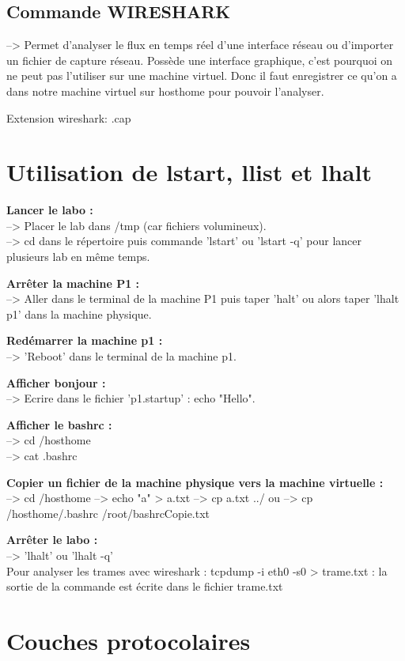 \documentclass[a4paper]{article}
\begin{document}
		\subsection{Commande WIRESHARK}
--> Permet d'analyser le flux en temps réel d'une interface réseau ou d'importer un fichier de capture réseau.
Possède une interface graphique, c’est pourquoi on ne peut pas l’utiliser sur une machine virtuel. Donc il faut enregistrer ce qu’on a dans notre machine virtuel sur hosthome pour pouvoir l'analyser.		
		
Extension wireshark: .cap

		
	\section{Utilisation de lstart, llist et lhalt}

\textbf{Lancer le labo :}\\
--> Placer le lab dans /tmp (car fichiers volumineux).\\
--> cd dans le répertoire puis commande 'lstart' ou 'lstart -q' pour lancer plusieurs lab en même temps. 	

\textbf{Arrêter la machine P1 :}\\
--> Aller dans le terminal de la machine P1 puis taper 'halt' ou alors taper 'lhalt p1' dans la machine physique. 

\textbf{Redémarrer la machine p1 :}\\
--> 'Reboot' dans le terminal de la machine p1.

\textbf{Afficher bonjour :}\\
--> Ecrire dans le fichier 'p1.startup' : echo "Hello".

\textbf{Afficher le bashrc :}\\
--> cd /hosthome \\
--> cat .bashrc

\textbf{Copier un fichier de la machine physique vers la machine virtuelle :}\\
--> cd /hosthome
--> echo "a" > a.txt
--> cp a.txt ../
ou --> cp /hosthome/.bashrc /root/bashrcCopie.txt

\textbf{Arrêter le labo :}\\
--> 'lhalt' ou 'lhalt -q'\\

Pour analyser les trames avec wireshark : tcpdump -i eth0 -s0 > trame.txt : la sortie de la commande est écrite dans le fichier trame.txt
	
	\section{Couches protocolaires}
	
\end{document}
